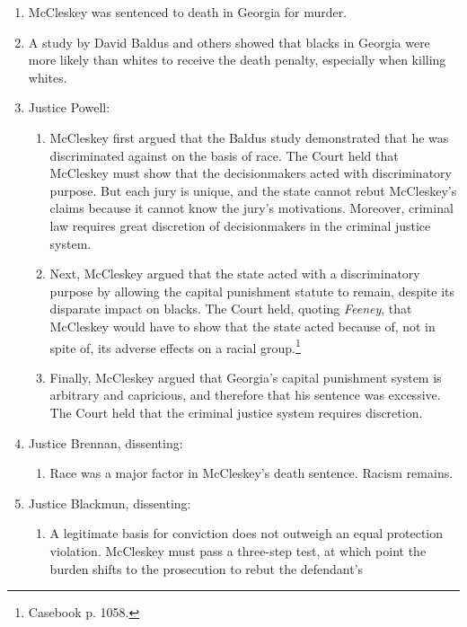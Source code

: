 \begin{enumerate}
    \item McCleskey was sentenced to death in Georgia for murder.
    \item A study by David Baldus and others showed that blacks in Georgia 
    were more likely than whites to receive the death penalty, especially when 
    killing whites.
    \item Justice Powell:
    \begin{enumerate}
        \item McCleskey first argued that the Baldus study demonstrated that 
        he was discriminated against on the basis of race. The Court held that 
        McCleskey must show that the decisionmakers acted with discriminatory 
        purpose. But each jury is unique, and the state cannot rebut 
        McCleskey's claims because it cannot know the jury's motivations. 
        Moreover, criminal law requires great discretion of decisionmakers in 
        the criminal justice system.
        \item Next, McCleskey argued that the state acted with a 
        discriminatory purpose by allowing the capital punishment statute to 
        remain, despite its disparate impact on blacks. The Court held, 
        quoting \emph{Feeney}, that McCleskey would have to show that the 
        state acted because of, not in spite of, its adverse effects on a 
        racial group.\footnote{Casebook p. 1058.}
        \item Finally, McCleskey argued that Georgia's capital punishment 
        system is arbitrary and capricious, and therefore that his sentence 
        was excessive. The Court held that the criminal justice system 
        requires discretion.
    \end{enumerate}
    \item Justice Brennan, dissenting:
    \begin{enumerate}
        \item Race was a major factor in McCleskey's death sentence. Racism 
        remains.
    \end{enumerate}
    \item Justice Blackmun, dissenting:
    \begin{enumerate}
        \item A legitimate basis for conviction does not outweigh an equal 
        protection violation. McCleskey must pass a three-step test, at which 
        point the burden shifts to the prosecution to rebut the defendant's 

\end{enumerate}
\end{enumerate}
